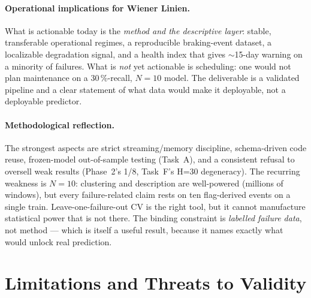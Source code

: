 \documentclass[11pt,a4paper]{article}
\begin{document}
\paragraph{Operational implications for Wiener Linien.}
What is actionable today is the \emph{method and the descriptive layer}: stable,
transferable operational regimes, a reproducible braking-event dataset, a localizable
degradation signal, and a health index that gives $\sim$15-day warning on a minority of
failures. What is \emph{not} yet actionable is scheduling: one would not plan maintenance
on a 30\,\%-recall, $N=10$ model. The deliverable is a validated pipeline and a clear
statement of what data would make it deployable, not a deployable predictor.

\paragraph{Methodological reflection.}
The strongest aspects are strict streaming/memory discipline, schema-driven code reuse,
frozen-model out-of-sample testing (Task~A), and a consistent refusal to oversell weak
results (Phase~2's 1/8, Task~F's H=30 degeneracy). The recurring weakness is
\textbf{$N=10$}: clustering and description are well-powered (millions of windows), but
every failure-related claim rests on ten flag-derived events on a single train.
Leave-one-failure-out CV is the right tool, but it cannot manufacture statistical power
that is not there. The binding constraint is \emph{labelled failure data}, not method ---
which is itself a useful result, because it names exactly what would unlock real
prediction.

\setcounter{section}{8}
\section{Limitations and Threats to Validity}
\label{sec:limitations}
\end{document}
